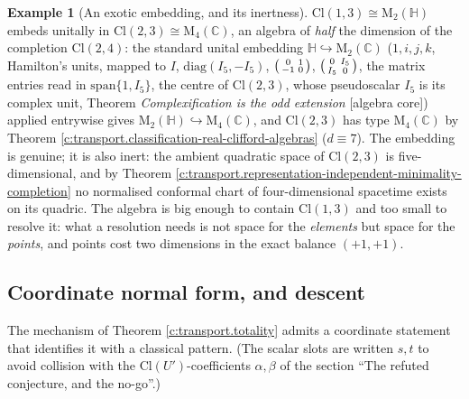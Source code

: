 \documentclass[11pt]{article}
\theoremstyle{definition}
\newtheorem{example}[theorem]{Example}
\theoremstyle{plain}
\newcommand{\changedmark}[2]{\marginpar{\raggedright\scriptsize\color{#1}#2}}
\providecommand{\C}{}\renewcommand{\C}{\mathbb{C}}
\providecommand{\Cl}{}\renewcommand{\Cl}{\mathrm{Cl}}
\providecommand{\HH}{}\renewcommand{\HH}{\mathbb{H}}
\providecommand{\Mat}{}\renewcommand{\Mat}{\mathrm{M}}
\begin{document}
\begin{example}[An exotic embedding, and its inertness]\label{c:note.transport.exotic-embedding-inertness}
\changedmark{BurntOrange}{changed since the deposit}
$\Cl(1,3) \cong \Mat_2(\HH)$ embeds unitally in $\Cl(2,3) \cong \Mat_4(\C)$, an algebra of \emph{half} the dimension of the completion $\Cl(2,4)$: the standard unital embedding $\HH \hookrightarrow \Mat_2(\C)$ ($1, i, j, k$, Hamilton's units, mapped to $I$, $\mathrm{diag}(I_5, -I_5)$, $\begin{psmallmatrix}0&1\\-1&0\end{psmallmatrix}$, $\begin{psmallmatrix}0&I_5\\I_5&0\end{psmallmatrix}$, the matrix entries read in $\mathrm{span}\{1, I_5\}$, the centre of $\Cl(2,3)$, whose pseudoscalar $I_5$ is its complex unit, Theorem \emph{Complexification is the odd extension} [algebra core]) applied entrywise gives $\Mat_2(\HH) \hookrightarrow \Mat_4(\C)$, and $\Cl(2,3)$ has type $\Mat_4(\C)$ by Theorem \ref{c:transport.classification-real-clifford-algebras} ($d \equiv 7$). The embedding is genuine; it is also inert: the ambient quadratic space of $\Cl(2,3)$ is five-dimensional, and by Theorem \ref{c:transport.representation-independent-minimality-completion} no normalised conformal chart of four-dimensional spacetime exists on its quadric. The algebra is big enough to contain $\Cl(1,3)$ and too small to resolve it: what a resolution needs is not space for the \emph{elements} but space for the \emph{points}, and points cost two dimensions in the exact balance $(+1,+1)$.
\end{example}

\subsection*{Coordinate normal form, and descent}
\label{c:note.transport.setting-coordinate-normal-form-descent}
The mechanism of Theorem \ref{c:transport.totality} admits a coordinate statement that identifies it with a classical pattern. (The scalar slots are written $s, t$ to avoid collision with the $\Cl(U')$-coefficients $\alpha, \beta$ of the section ``The refuted conjecture, and the no-go''.)
\end{document}
